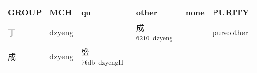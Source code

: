 \documentclass[14pt,a4paper]{scrartcl}
\begin{document}
\begin{longtable}[c]{@{}llllll@{}}
\toprule
\begin{minipage}[b]{0.14\columnwidth}\raggedright\strut
GROUP
\strut\end{minipage} &
\begin{minipage}[b]{0.14\columnwidth}\raggedright\strut
MCH
\strut\end{minipage} &
\begin{minipage}[b]{0.14\columnwidth}\raggedright\strut
qu
\strut\end{minipage} &
\begin{minipage}[b]{0.14\columnwidth}\raggedright\strut
other
\strut\end{minipage} &
\begin{minipage}[b]{0.14\columnwidth}\raggedright\strut
none
\strut\end{minipage} &
\begin{minipage}[b]{0.14\columnwidth}\raggedright\strut
PURITY
\strut\end{minipage}\tabularnewline
\midrule
\endhead
\begin{minipage}[t]{0.14\columnwidth}\raggedright\strut
丁
\strut\end{minipage} &
\begin{minipage}[t]{0.14\columnwidth}\raggedright\strut
dzyeng
\strut\end{minipage} &
\begin{minipage}[t]{0.14\columnwidth}\raggedright\strut
\strut\end{minipage} &
\begin{minipage}[t]{0.14\columnwidth}\raggedright\strut
成\textsuperscript{6210~dzyeng}
\strut\end{minipage} &
\begin{minipage}[t]{0.14\columnwidth}\raggedright\strut
\strut\end{minipage} &
\begin{minipage}[t]{0.14\columnwidth}\raggedright\strut
pure:other
\strut\end{minipage}\tabularnewline
\begin{minipage}[t]{0.14\columnwidth}\raggedright\strut
成
\strut\end{minipage} &
\begin{minipage}[t]{0.14\columnwidth}\raggedright\strut
dzyeng
\strut\end{minipage} &
\begin{minipage}[t]{0.14\columnwidth}\raggedright\strut
盛\textsuperscript{76db~dzyengH}
\strut\end{minipage} &

\end{longtable}
\end{document}

